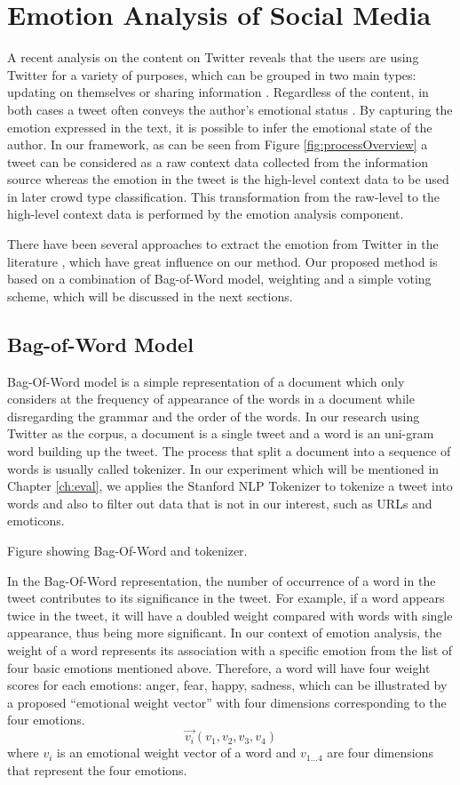 \section{Emotion Analysis of Social Media}

A recent analysis on the content on Twitter reveals that the users are using Twitter for a variety of purposes, which can be grouped in two main types: updating on themselves or sharing information \citep{java2007we}. Regardless of the content, in both cases a tweet often conveys the author's emotional status \citep{bollen2009modeling}. By capturing the emotion expressed in the text, it is possible to infer the emotional state of the author. In our framework, as can be seen from Figure \ref{fig:processOverview} a tweet can be considered as a raw context data collected from the information source whereas the emotion in the tweet is the high-level context data to be used in later crowd type classification. This transformation from the raw-level to the high-level context data is performed by the emotion analysis component.

There have been several approaches to extract the emotion from Twitter in the literature \citep{roberts2012empatweet, bollen2009modeling, mohammad2012emotional, mohammad2014using}, which have great influence on our method. Our proposed method is based on a combination of Bag-of-Word model, weighting and a simple voting scheme, which will be discussed in the next sections.

\subsection{Bag-of-Word Model}
Bag-Of-Word model is a simple representation of a document which only considers at the frequency of appearance of the words in a document while disregarding the grammar and the order of the words. In our research using Twitter as the corpus, a document is a single tweet and a word is an uni-gram word building up the tweet. The process that split a document into a sequence of words is usually called tokenizer. In our experiment which will be mentioned in Chapter \ref{ch:eval}, we applies the Stanford NLP Tokenizer to tokenize a tweet into words and also to filter out data that is not in our interest, such as URLs and emoticons. 

Figure showing Bag-Of-Word and tokenizer.

In the Bag-Of-Word representation, the number of occurrence of a word in the tweet contributes to its significance in the tweet. For example, if a word appears twice in the tweet, it will have a doubled weight compared with words with single appearance, thus being more significant. In our context of emotion analysis, the weight of a word represents its association with a specific emotion from the list of four basic emotions mentioned above. Therefore, a word will have four weight scores for each emotions: anger, fear, happy, sadness, which can be illustrated by a proposed ``emotional weight vector'' with four dimensions corresponding to the four emotions. 
\[
	\vec{v_i}(v_1, v_2, v_3, v_4)
\] where \(v_i\) is an emotional weight vector of a word and \(v_{1...4}\) are four dimensions that represent the four emotions.

